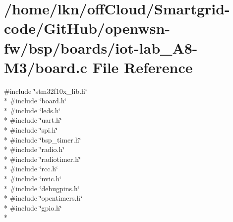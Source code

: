 \hypertarget{iot-lab___a8-_m3_2board_8c}{}\section{/home/lkn/off\+Cloud/\+Smartgrid-\/code/\+Git\+Hub/openwsn-\/fw/bsp/boards/iot-\/lab\+\_\+\+A8-\/\+M3/board.c File Reference}
\label{iot-lab___a8-_m3_2board_8c}
{\ttfamily \#include \char`\"{}stm32f10x\+\_\+lib.\+h\char`\"{}}\\*
{\ttfamily \#include \char`\"{}board.\+h\char`\"{}}\\*
{\ttfamily \#include \char`\"{}leds.\+h\char`\"{}}\\*
{\ttfamily \#include \char`\"{}uart.\+h\char`\"{}}\\*
{\ttfamily \#include \char`\"{}spi.\+h\char`\"{}}\\*
{\ttfamily \#include \char`\"{}bsp\+\_\+timer.\+h\char`\"{}}\\*
{\ttfamily \#include \char`\"{}radio.\+h\char`\"{}}\\*
{\ttfamily \#include \char`\"{}radiotimer.\+h\char`\"{}}\\*
{\ttfamily \#include \char`\"{}rcc.\+h\char`\"{}}\\*
{\ttfamily \#include \char`\"{}nvic.\+h\char`\"{}}\\*
{\ttfamily \#include \char`\"{}debugpins.\+h\char`\"{}}\\*
{\ttfamily \#include \char`\"{}opentimers.\+h\char`\"{}}\\*
{\ttfamily \#include \char`\"{}gpio.\+h\char`\"{}}\\*
